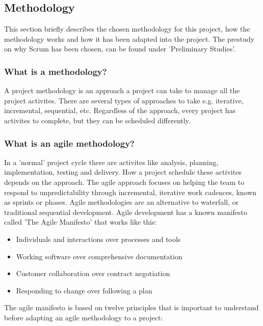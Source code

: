 \subsection{Methodology}

This section briefly describes the chosen methodology for this project, how the methodology works and how it has been adapted into the project. The prestudy on why Scrum has been chosen, can be found under 'Preliminary Studies'. 

\subsubsection{What is a methodology?}

A project methodology is an approach a project can take to manage all the project activites. There are several types of approaches to take e.g. iterative, incremental, sequential, etc. Regardless of the approach, every project has activites to complete, but they can be scheduled differently.

\subsubsection{What is an agile methodology?}

In a 'normal' project cycle there are activites like analysis, planning, implementation, testing and delivery. How a project schedule these activites depends on the approach. 
The agile approach focuses on helping the team to respond to unpredictability through incremental, iterative work cadences, known as sprints or phases. Agile methodologies are an alternative to waterfall, or traditional sequential development.
Agile development has a known manifesto called 'The Agile Manifesto' that works like this:

\begin{itemize}
	\item Individuals and interactions over processes and tools
    \item Working software over comprehensive documentation
    \item Customer collaboration over contract negotiation
    \item Responding to change over following a plan 
\end{itemize}

The agile manifesto is based on twelve principles that is important to understand before
adapting an agile methodology to a project:

